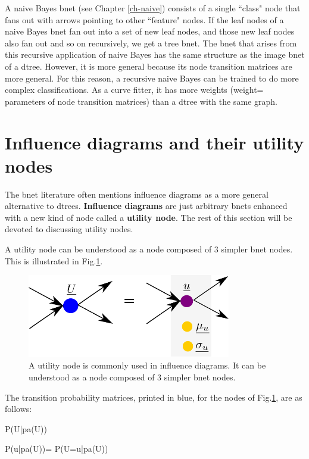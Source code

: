 A naive Bayes bnet 
(see Chapter \ref{ch-naive})
consists of a single ``class"
 node that fans
out with arrows 
pointing to other
``feature" nodes.
If the leaf nodes
of a naive
Bayes bnet
fan out into 
a set of new leaf
nodes, and those new
leaf nodes
also
fan out
and so on recursively,
we get a 
tree bnet.
The bnet
that arises
from
this recursive
application
of naive Bayes
has the same structure
as the image bnet of a dtree.
However, it is more
general because its node
transition matrices are more general. For
this reason, a recursive
naive Bayes
can be trained to
do more complex classifications.
As a curve fitter, it has more
weights (weight=
parameters of node
transition matrices) than a dtree
with the same graph.



\section*{Influence diagrams and 
their utility nodes}
The bnet literature
often mentions influence
diagrams as a more
general alternative  to dtrees.
{\bf Influence diagrams} are
just arbitrary bnets
enhanced with a 
new kind of node called a {\bf 
utility node}.
The rest
of this section  will 
be devoted to discussing utility nodes.

A utility node
can be
understood
as a node
composed of 3 simpler bnet nodes.
This
is illustrated in Fig.\ref{fig-util-node}.

\begin{figure}[h!]
\centering
\includegraphics[width=3.5in]
{dtree/util-node.png}
\caption{A utility node
is commonly used in influence
diagrams. It can be
understood
as a node 
composed of 3 simpler bnet nodes.} 
\label{fig-util-node}
\end{figure}

The transition probability matrices,
printed in blue,
for the nodes
of Fig.\ref{fig-util-node},
are as follows:

\beq\color{blue}
P(U|pa(U))
\eeq

\beq\color{blue}
P(u|pa(U))=
P(U=u|pa(U))
\eeq

